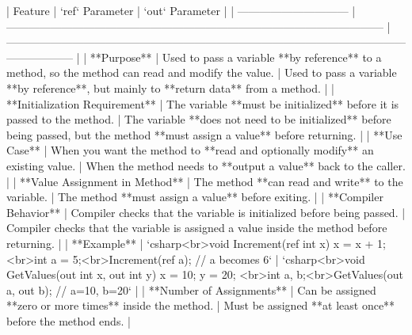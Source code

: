 | Feature                        | `ref` Parameter                                                                                        | `out` Parameter                                                                                                                |
| ------------------------------ | ------------------------------------------------------------------------------------------------------ | ------------------------------------------------------------------------------------------------------------------------------ |
| **Purpose**                    | Used to pass a variable **by reference** to a method, so the method can read and modify the value.     | Used to pass a variable **by reference**, but mainly to **return data** from a method.                                         |
| **Initialization Requirement** | The variable **must be initialized** before it is passed to the method.                                | The variable **does not need to be initialized** before being passed, but the method **must assign a value** before returning. |
| **Use Case**                   | When you want the method to **read and optionally modify** an existing value.                          | When the method needs to **output a value** back to the caller.                                                                |
| **Value Assignment in Method** | The method **can read and write** to the variable.                                                     | The method **must assign a value** before exiting.                                                                             |
| **Compiler Behavior**          | Compiler checks that the variable is initialized before being passed.                                  | Compiler checks that the variable is assigned a value inside the method before returning.                                      |
| **Example**                    | `csharp<br>void Increment(ref int x) { x = x + 1; }<br>int a = 5;<br>Increment(ref a); // a becomes 6` | `csharp<br>void GetValues(out int x, out int y) { x = 10; y = 20; }<br>int a, b;<br>GetValues(out a, out b); // a=10, b=20`    |
| **Number of Assignments**      | Can be assigned **zero or more times** inside the method.                                              | Must be assigned **at least once** before the method ends.                                                                     |

